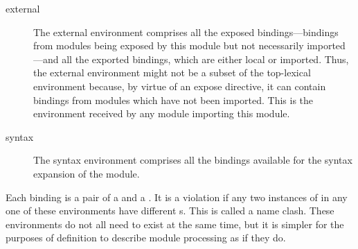 \begin{optDefinition}
\begin{description}
    \item[external] The external environment comprises all the exposed
    bindings---bindings from modules being exposed by this module but not
    necessarily imported---and all the exported bindings, which are either local
    or imported.  Thus, the external environment might not be a subset of the
    top-lexical environment because, by virtue of an expose directive, it can
    contain bindings from modules which have not been imported.  This is the
    environment received by any module importing this module.

    \item[syntax] The syntax environment comprises all the bindings available
    for the syntax expansion of the module.
\end{description}
%
Each binding is a pair of a  and a .  It is a
violation if any two instances of  in any one of these
environments have different s.  This is called a name clash.
These environments do not all need to exist at the same time, but it is simpler
for the purposes of definition to describe module processing as if they do.
\end{optDefinition}
%
\label{defmodule}
%
